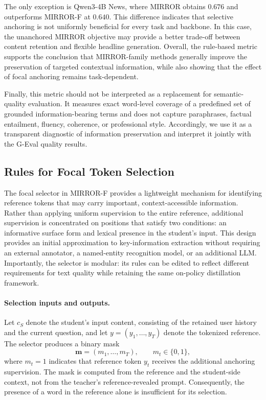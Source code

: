 \documentclass{article} %
\begin{document}
The only exception is Qwen3-4B News, where MIRROR obtains $0.676$ and
outperforms MIRROR-F at $0.640$. This difference indicates that selective
anchoring is not uniformly beneficial for every task and backbone. In this
case, the unanchored MIRROR objective may provide a better trade-off between
content retention and flexible headline generation. Overall, the rule-based
metric supports the conclusion that MIRROR-family methods generally improve
the preservation of targeted contextual information, while also showing that
the effect of focal anchoring remains task-dependent.

Finally, this metric should not be interpreted as a replacement for
semantic-quality evaluation. It measures exact word-level coverage of a
predefined set of grounded information-bearing terms and does not capture
paraphrases, factual entailment, fluency, coherence, or professional style.
Accordingly, we use it as a transparent diagnostic of information
preservation and interpret it jointly with the G-Eval quality results.
\subsection{Rules for Focal Token Selection}
\label{app:focal_token_selection}

The focal selector in MIRROR-F provides a lightweight mechanism for identifying reference tokens that may carry important, context-accessible information. Rather than applying uniform supervision to the entire reference, additional supervision is concentrated on positions that satisfy two conditions: an informative surface form and lexical presence in the student's input. This design provides an initial approximation to key-information extraction without requiring an external annotator, a named-entity recognition model, or an additional LLM. Importantly, the selector is modular: its rules can be edited to reflect different requirements for text quality while retaining the same on-policy distillation framework.

\paragraph{Selection inputs and outputs.}
Let $c_S$ denote the student's input content, consisting of the retained user history and the current question, and let $y=(y_1,\ldots,y_T)$ denote the tokenized reference. The selector produces a binary mask
\begin{equation}
\mathbf{m}=(m_1,\ldots,m_T),
\qquad m_t\in\{0,1\},
\end{equation}
where $m_t=1$ indicates that reference token $y_t$ receives the additional anchoring supervision. The mask is computed from the reference and the student-side context, not from the teacher's reference-revealed prompt. Consequently, the presence of a word in the reference alone is insufficient for its selection.
\end{document}
